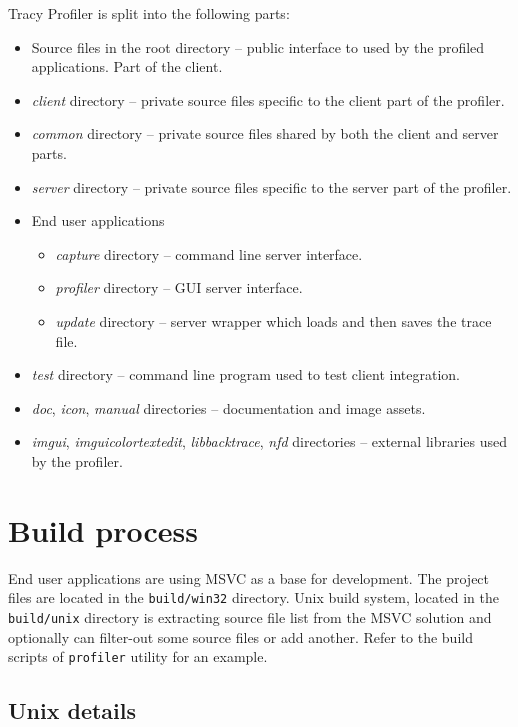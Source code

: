 \documentclass[hidelinks,titlepage,a4paper]{article}
\begin{document}
Tracy Profiler is split into the following parts:

\begin{itemize}
\item Source files in the root directory -- public interface to used by the profiled applications. Part of the client.
\item \emph{client} directory -- private source files specific to the client part of the profiler.
\item \emph{common} directory -- private source files shared by both the client and server parts.
\item \emph{server} directory -- private source files specific to the server part of the profiler.
\item End user applications
\begin{itemize}
\item \emph{capture} directory -- command line server interface.
\item \emph{profiler} directory -- GUI server interface.
\item \emph{update} directory -- server wrapper which loads and then saves the trace file.
\end{itemize}
\item \emph{test} directory -- command line program used to test client integration.
\item \emph{doc}, \emph{icon}, \emph{manual} directories -- documentation and image assets.
\item \emph{imgui}, \emph{imguicolortextedit}, \emph{libbacktrace}, \emph{nfd} directories -- external libraries used by the profiler.
\end{itemize}

\section{Build process}

End user applications are using MSVC as a base for development. The project files are located in the \texttt{build/win32} directory. Unix build system, located in the \texttt{build/unix} directory is extracting source file list from the MSVC solution and optionally can filter-out some source files or add another. Refer to the build scripts of \texttt{profiler} utility for an example.

\subsection{Unix details}
\end{document}
